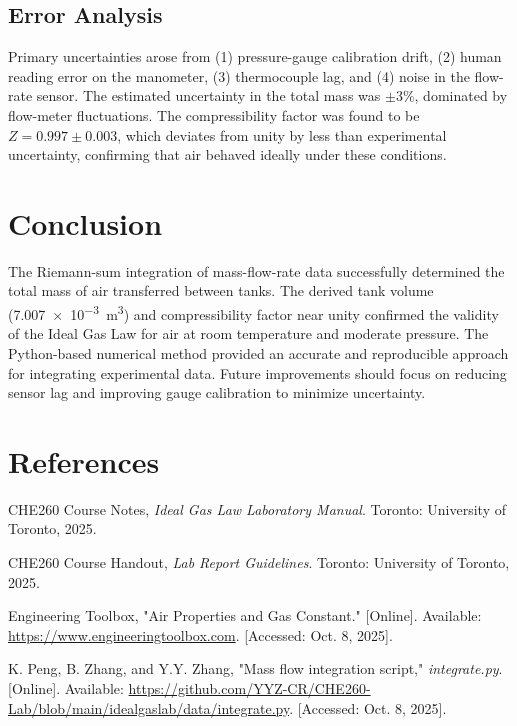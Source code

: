 \documentclass[12pt]{article}
\begin{document}
\subsection*{Error Analysis}
Primary uncertainties arose from (1) pressure-gauge calibration drift, (2) human reading error on the manometer, (3) thermocouple lag, and (4) noise in the flow-rate sensor.  
The estimated uncertainty in the total mass was \(\pm 3\%\), dominated by flow-meter fluctuations.  
The compressibility factor was found to be \(Z = 0.997 \pm 0.003\), which deviates from unity by less than experimental uncertainty, confirming that air behaved ideally under these conditions.


\section*{Conclusion}
The Riemann-sum integration of mass-flow-rate data successfully determined the total mass of air transferred between tanks. The derived tank volume (\SI{7.007e-3}{\metre\cubed}) and compressibility factor near unity confirmed the validity of the Ideal Gas Law for air at room temperature and moderate pressure. The Python-based numerical method provided an accurate and reproducible approach for integrating experimental data. Future improvements should focus on reducing sensor lag and improving gauge calibration to minimize uncertainty.

\section*{References}
\begin{thebibliography}{9}
CHE260 Course Notes, \textit{Ideal Gas Law Laboratory Manual}. Toronto: University of Toronto, 2025.

CHE260 Course Handout, \textit{Lab Report Guidelines}. Toronto: University of Toronto, 2025.

Engineering Toolbox, "Air Properties and Gas Constant." [Online]. Available: \url{https://www.engineeringtoolbox.com}. [Accessed: Oct. 8, 2025].

K. Peng, B. Zhang, and Y.Y. Zhang, "Mass flow integration script," \textit{integrate.py}. [Online]. Available: \url{https://github.com/YYZ-CR/CHE260-Lab/blob/main/idealgaslab/data/integrate.py}. [Accessed: Oct. 8, 2025].
\end{thebibliography}
\end{document}
